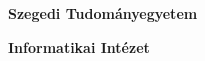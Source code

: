 \documentclass[12pt]{report}
\begin{document}
\thispagestyle{empty}

\begin{center}
{\Large\bf Szegedi Tudományegyetem}

\vspace{0.5cm}

{\Large\bf Informatikai Intézet}

\vspace*{8.5cm}

{\Huge\bf\MakeUppercase{\dolgozatTipusa}}

\vspace*{7cm}

{\LARGE\bf \nev}

\vspace*{0.6cm}

{\Large\bf \ev}

\end{center}
\end{document}

